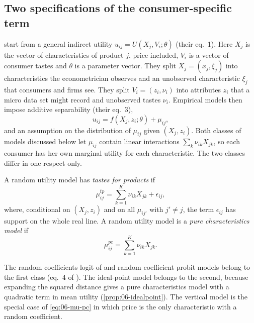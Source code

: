 \subsection{Two specifications of the consumer-specific term}\label{sec:06-tp-pc}

\citet{BerryPakes2007} start from a general indirect utility $u_{ij} = U(X_j, V_i; \theta)$ (their eq.~1). Here $X_j$
is the vector of characteristics of product $j$, price included, $V_i$ is a vector of consumer tastes and $\theta$ is a
parameter vector. They split $X_j = (x_j, \xi_j)$ into characteristics the econometrician observes and an unobserved
characteristic $\xi_j$ that consumers and firms see. They split $V_i = (z_i, \nu_i)$ into attributes $z_i$ that a
micro data set might record and unobserved tastes $\nu_i$. Empirical models then impose additive separability (their
eq.~3),
\begin{equation}\label{eq:06-bp-additive}
  u_{ij} = f(X_j, z_i; \theta) + \mu_{ij},
\end{equation}
and an assumption on the distribution of $\mu_{ij}$ given $(X_j, z_i)$. Both classes of models discussed below let
$\mu_{ij}$ contain linear interactions $\sum_k \nu_{ik} X_{jk}$, so each consumer has her own marginal utility for each
characteristic. The two classes differ in one respect only.

\begin{definition}\label{def:06-tp-pc}
A random utility model has \emph{tastes for products} if
\begin{equation}\label{eq:06-mu-tp}
  \mu^{tp}_{ij} = \sum_{k=1}^{K} \nu_{ik} X_{jk} + \epsilon_{ij},
\end{equation}
where, conditional on $(X_j, z_i)$ and on all $\mu_{ij'}$ with $j' \ne j$, the term $\epsilon_{ij}$ has support on the whole
real line. A random utility model is a \emph{pure characteristics model} if
\begin{equation}\label{eq:06-mu-pc}
  \mu^{pc}_{ij} = \sum_{k=1}^{K} \nu_{ik} X_{jk}.
\end{equation}
\end{definition}

The random coefficients logit of \citet{BerryLevinsohnPakes1995} and random coefficient probit models belong to the
first class (eq.~4 of \citealp{BerryPakes2007}). The ideal-point model belongs to the second, because expanding the
squared distance gives a pure characteristics model with a quadratic term in mean utility
(\cref{prop:06-idealpoint}). The vertical model is the special case of \eqref{eq:06-mu-pc} in which price is the only
characteristic with a random coefficient.

